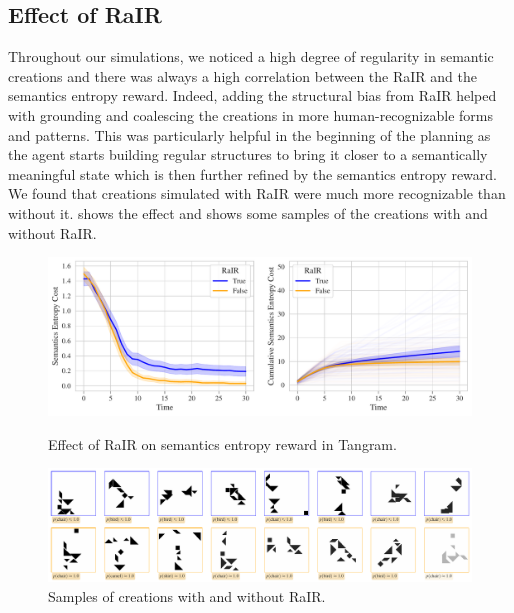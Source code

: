 \subsection{Effect of RaIR}
\label{sec:effect-rair}

Throughout our simulations, we noticed a high degree of regularity in semantic creations and there was always a high correlation between the RaIR and the semantics entropy reward. 
Indeed, adding the structural bias from RaIR helped with grounding and coalescing the creations in more human-recognizable forms and patterns.
This was particularly helpful in the beginning of the planning as the agent starts building regular structures to bring it closer to a semantically meaningful state which is then further refined by the semantics entropy reward.
We found that creations simulated with RaIR were much more recognizable than without it.
 shows the effect and  shows some samples of the creations with and without RaIR.


\begin{figure}[h]
    \centering
    \includegraphics[width=\textwidth]{images/rair_comparison.pdf}
    \caption{Effect of RaIR on semantics entropy reward in Tangram.}
    \label{fig:rair}
    \includegraphics[width=\textwidth]{images/rair_samples.pdf}
    \vspace{12pt}
    \caption{Samples of creations with and without RaIR.}
    \label{fig:rair-samples}
\end{figure}

